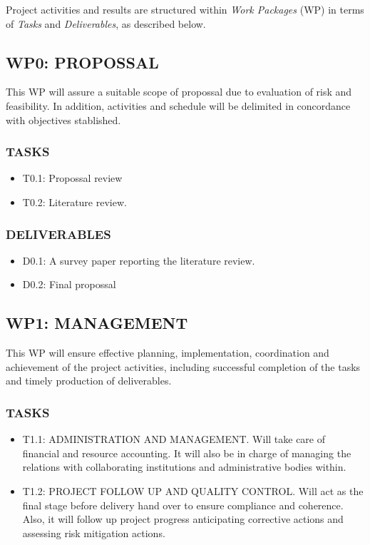 \documentclass[letterpaper,12pt]{article}
\begin{document}
Project activities and results are structured within \textit{Work Packages} (WP) in terms of \textit{Tasks} and \textit{Deliverables}, as described below.

\subsection*{WP0: PROPOSSAL}

This WP will assure a suitable scope of propossal due to evaluation of risk and feasibility. In addition, activities and schedule will be delimited in concordance with objectives stablished.

\subsubsection*{TASKS}
\begin{itemize}
 \item T0.1: Propossal review
 \item T0.2: Literature review.
\end{itemize}


\subsubsection*{DELIVERABLES}
\begin{itemize}
 \item D0.1: A survey paper reporting the literature review.
 \item D0.2: Final propossal
\end{itemize}


\subsection*{WP1: MANAGEMENT }

This WP will ensure effective planning, implementation, coordination and achievement of the project activities, including successful completion of the tasks and timely production of deliverables.

\subsubsection*{TASKS }
\begin{itemize}
\item T1.1: ADMINISTRATION AND MANAGEMENT. Will take care of financial and resource accounting. It will also be in charge of managing the relations with collaborating institutions and administrative bodies within.
\item T1.2: PROJECT FOLLOW UP AND QUALITY CONTROL. Will act as the final stage before delivery hand over to ensure compliance and coherence. Also, it will follow up project progress anticipating corrective actions and assessing risk mitigation actions.
\end{itemize}
\end{document}
